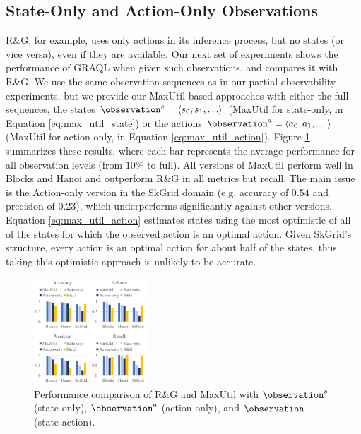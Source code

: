 \documentclass[letterpaper]{article} %
\begin{document}
\subsection{State-Only and Action-Only Observations}

R\&G, for example, uses only actions in its inference process, but no states (or vice versa), even if they are available.
Our next set of experiments shows the performance of GRAQL when given such observations, and compares it with R\&G.
We use the same observation sequences as in our partial observability experiments, but we provide our MaxUtil-based approaches with either the full sequences, the states $\observation^s = \langle s_0, s_1, \ldots \rangle$ (MaxUtil for state-only, in Equation \ref{eq:max_util_state}) or the actions $\observation^a = \langle a_0, a_1, \ldots \rangle$ (MaxUtil for action-only, in Equation \ref{eq:max_util_action}).
%
Figure \ref{fig:simpler_obs} summarizes these results, where each bar represents the average performance for all observation levels (from $10\%$ to full).
All versions of MaxUtil perform well in Blocks and Hanoi and outperform R\&G in all metrics but recall.
The main issue is the Action-only version in the SkGrid domain (e.g. accuracy of $0.54$ and precision of $0.23$), which underperforms significantly against other versions.
Equation \ref{eq:max_util_action} estimates states using the most optimistic of all of the states for which the observed action is an optimal action.
Given SkGrid's structure, every action is an optimal action for about half of the states, thus taking this optimistic approach is unlikely to be accurate.

\begin{figure}[!b]
    \centering
    \includegraphics[width=0.38\textwidth]{Figures/simpler_observations.pdf}
    \caption{Performance comparison of R\&G and MaxUtil with $\observation^s$ (state-only), $\observation^a$ (action-only), and $\observation$ (state-action).}
    \label{fig:simpler_obs}
\end{figure}
\end{document}
